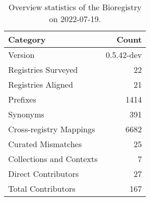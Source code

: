 \begin{table}
\centering
\caption{Overview statistics of the Bioregistry on 2022-07-19.}
\label{tab:bioregistry-summary}
\begin{tabular}{lr}
\toprule
                Category &      Count \\
\midrule
                 Version & 0.5.42-dev \\
     Registries Surveyed &         22 \\
      Registries Aligned &         21 \\
                Prefixes &       1414 \\
                Synonyms &        391 \\
 Cross-registry Mappings &       6682 \\
      Curated Mismatches &         25 \\
Collections and Contexts &          7 \\
     Direct Contributors &         27 \\
      Total Contributors &        167 \\
\bottomrule
\end{tabular}
\end{table}
